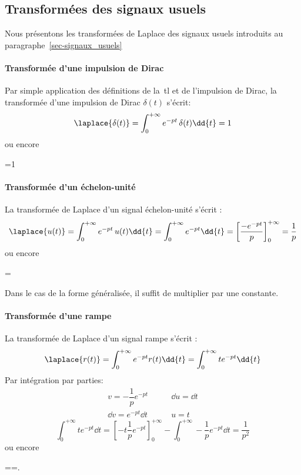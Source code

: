 \subsection{Transformées des signaux usuels}
Nous présentons les transformées de Laplace des signaux usuels introduits
au paragraphe~\ref{sec-signaux_usuels}

\paragraph{Transformée d'une impulsion de Dirac}
Par simple application des définitions 
de la~\gls{tl} et de l'impulsion de Dirac, la transformée d'une 
impulsion de Dirac $\delta(t)$ s'écrit:
$$
\laplace{\delta(t)}=\int_{0}^{+\infty} e^{-pt}\,\delta(t)\dd{t}=1
$$
ou encore
\begin{bequation}
    =1
\end{bequation}

\paragraph{Transformée d'un échelon-unité}
La transformée de Laplace d'un signal échelon-unité  s'écrit : 
$$
\laplace{u(t)}=\int_{0}^{+\infty} e^{-pt}\,u(t)\dd{t}=\int_{0}^{+\infty} e^{-pt}\dd{t}=\left[\dfrac{-e^{-pt}}{p}\right]_0^{+\infty}=\dfrac{1}{p}
$$
ou encore
\begin{bequation}
    =
\end{bequation}
Dans le cas de la forme généralisée, il suffit de multiplier par une constante.

\paragraph{Transformée d'une rampe}
La transformée de Laplace d'un signal rampe s'écrit :
$$
\laplace{r(t)}=\int_{0}^{+\infty} e^{-pt}r(t)\dd{t}=\int_{0}^{+\infty} te^{-pt}\dd{t}
$$
Par intégration par parties:
\begin{align*}
    v=-\dfrac{1}{p}e^{-pt}\qquad&\dd{u}=\dd{t}\\
    \dd{v}=e^{-pt}\dd{t}\qquad&u=t
\end{align*}
$$
\int_{0}^{+\infty} te^{-pt}\dd{t} = \left[-t\dfrac{1}{p}e^{-pt}\right]_0^{+\infty}-\int_{0}^{+\infty} -\dfrac{1}{p}e^{-pt}\dd{t}=\dfrac{1}{p^2}
$$
ou encore
\begin{bequation}
    ==.
\end{bequation}

